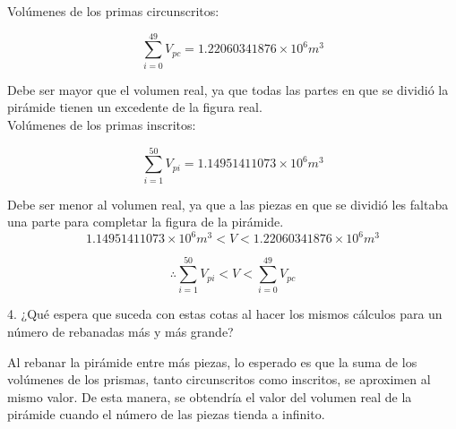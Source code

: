 \documentclass[12pt]{article}
\begin{document}
Volúmenes de los primas circunscritos: 

\[
\sum_{i=0}^{49} V_{pc} = 1.22060341876 \times 10^6 m^3  
\]

Debe ser mayor que el volumen real, ya que todas las partes en que se dividió la pirámide tienen un excedente de la figura real.\\

Volúmenes de los primas inscritos:

\[
\sum_{i=1}^{50} V_{pi} = 1.14951411073 \times 10^6 m^3
\]

Debe ser menor al volumen real, ya que a las piezas en que se dividió les faltaba una parte para completar la figura de la pirámide. \\

\[
1.14951411073 \times 10^6 m^3 < V < 1.22060341876 \times 10^6 m^3 
\]

\[
\therefore \sum_{i=1}^{50} V_{pi} < V < \sum_{i=0}^{49} V_{pc}
\]

4. ¿Qué espera que suceda con estas cotas al hacer los mismos cálculos para un número de rebanadas más y más grande? 

Al rebanar la pirámide entre más piezas, lo esperado es que la suma de los volúmenes de los prismas, tanto circunscritos como inscritos, se aproximen al mismo valor. De esta manera, se obtendría el valor del volumen real de la pirámide cuando el número de las piezas tienda a infinito.
\end{document}
